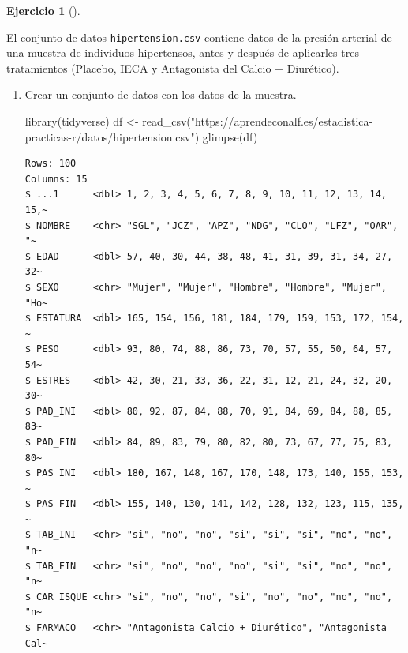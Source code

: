 \documentclass[
  a4paper,
]{scrreport}
\newenvironment{Shaded}{\begin{snugshade}}{\end{snugshade}}
\newcommand{\FunctionTok}[1]{\textcolor[rgb]{0.28,0.35,0.67}{#1}}
\newcommand{\NormalTok}[1]{\textcolor[rgb]{0.00,0.23,0.31}{#1}}
\newcommand{\OtherTok}[1]{\textcolor[rgb]{0.00,0.23,0.31}{#1}}
\newcommand{\StringTok}[1]{\textcolor[rgb]{0.13,0.47,0.30}{#1}}
\theoremstyle{definition}
\newtheorem{exercise}{Ejercicio}[chapter]
\theoremstyle{remark}
\begin{document}
\begin{exercise}[]\protect\hypertarget{exr-contraste-hipotesis-media-hipertension}{}\label{exr-contraste-hipotesis-media-hipertension}

El conjunto de datos \texttt{hipertension.csv} contiene datos de la
presión arterial de una muestra de individuos hipertensos, antes y
después de aplicarles tres tratamientos (Placebo, IECA y Antagonista del
Calcio + Diurético).

\begin{enumerate}
\def\labelenumi{\alph{enumi}.}
\item
  Crear un conjunto de datos con los datos de la muestra.

  \begin{tcolorbox}[enhanced jigsaw, colframe=quarto-callout-tip-color-frame, toprule=.15mm, bottomtitle=1mm, breakable, opacitybacktitle=0.6, toptitle=1mm, colback=white, bottomrule=.15mm, title=\textcolor{quarto-callout-tip-color}{\faLightbulb}\hspace{0.5em}{Solución}, arc=.35mm, left=2mm, titlerule=0mm, rightrule=.15mm, coltitle=black, leftrule=.75mm, opacityback=0, colbacktitle=quarto-callout-tip-color!10!white]

\begin{Shaded}
\begin{Highlighting}[]
\FunctionTok{library}\NormalTok{(tidyverse)}
\NormalTok{df }\OtherTok{\textless{}{-}} \FunctionTok{read\_csv}\NormalTok{(}\StringTok{"https://aprendeconalf.es/estadistica{-}practicas{-}r/datos/hipertension.csv"}\NormalTok{)}
\FunctionTok{glimpse}\NormalTok{(df)}
\end{Highlighting}
\end{Shaded}

\begin{verbatim}
Rows: 100
Columns: 15
$ ...1      <dbl> 1, 2, 3, 4, 5, 6, 7, 8, 9, 10, 11, 12, 13, 14, 15,~
$ NOMBRE    <chr> "SGL", "JCZ", "APZ", "NDG", "CLO", "LFZ", "OAR", "~
$ EDAD      <dbl> 57, 40, 30, 44, 38, 48, 41, 31, 39, 31, 34, 27, 32~
$ SEXO      <chr> "Mujer", "Mujer", "Hombre", "Hombre", "Mujer", "Ho~
$ ESTATURA  <dbl> 165, 154, 156, 181, 184, 179, 159, 153, 172, 154, ~
$ PESO      <dbl> 93, 80, 74, 88, 86, 73, 70, 57, 55, 50, 64, 57, 54~
$ ESTRES    <dbl> 42, 30, 21, 33, 36, 22, 31, 12, 21, 24, 32, 20, 30~
$ PAD_INI   <dbl> 80, 92, 87, 84, 88, 70, 91, 84, 69, 84, 88, 85, 83~
$ PAD_FIN   <dbl> 84, 89, 83, 79, 80, 82, 80, 73, 67, 77, 75, 83, 80~
$ PAS_INI   <dbl> 180, 167, 148, 167, 170, 148, 173, 140, 155, 153, ~
$ PAS_FIN   <dbl> 155, 140, 130, 141, 142, 128, 132, 123, 115, 135, ~
$ TAB_INI   <chr> "si", "no", "no", "si", "si", "si", "no", "no", "n~
$ TAB_FIN   <chr> "si", "no", "no", "no", "si", "si", "no", "no", "n~
$ CAR_ISQUE <chr> "si", "no", "no", "si", "no", "no", "no", "no", "n~
$ FARMACO   <chr> "Antagonista Calcio + Diurético", "Antagonista Cal~
\end{verbatim}


\end{tcolorbox}
\end{enumerate}
\end{exercise}
\end{document}
